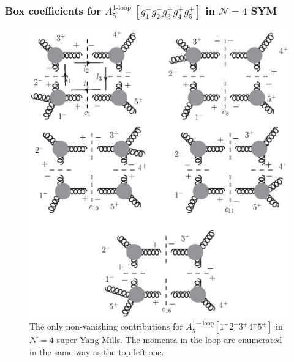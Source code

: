 \documentclass[english]{beamer}
\begin{document}
\begin{frame}[shrink=20]
\frametitle{Box coefficients for $A_5^{\textrm{1-loop }}[g_1^-g_2^-g_3^+g_4^+g_5^+]$ in  $\mathcal{N}=4$ SYM}

\begin{figure}
  \centering
  \includegraphics[width=0.8\linewidth]{A5mhv.eps}
  \caption{The only non-vanishing contributions for $A_5^{\mathrm{1-loop}}[1^-2^-3^+4^+5^+]$ in $\mathcal{N}=4$ super Yang-Mills. The momenta in the loop are enumerated in the same way as the top-left one.}
  \label{fig-a5mhv}
\end{figure}

\end{frame}
\end{document}
